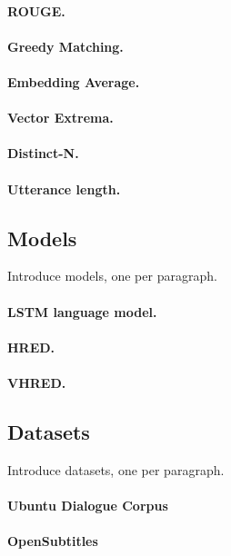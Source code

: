 \documentclass[runningheads]{llncs}
\begin{document}
    \paragraph{ROUGE.}

    \paragraph{Greedy Matching.}
    \paragraph{Embedding Average.}
    \paragraph{Vector Extrema.}

    \paragraph{Distinct-N.}
    \paragraph{Utterance length.}

    \subsection{Models}
    Introduce models, one per paragraph.
    \paragraph{LSTM language model.}
    \paragraph{HRED.}
    \paragraph{VHRED.}

    \subsection{Datasets}
    Introduce datasets, one per paragraph.
    \paragraph{Ubuntu Dialogue Corpus}
    \paragraph{OpenSubtitles}
\end{document}
